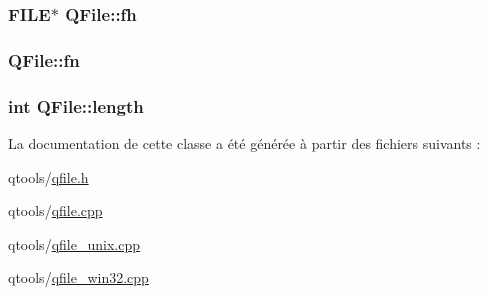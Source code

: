 \subsubsection[{fh}]{\setlength{\rightskip}{0pt plus 5cm}F\+I\+L\+E$\ast$ Q\+File\+::fh\hspace{0.3cm}{\ttfamily [protected]}}\label{class_q_file_a1ff87fa1a08ce3d4d8ae87252f4be11a}
\hypertarget{class_q_file_ae088d4677b272210ec510c55454930a4}{}
\subsubsection[{fn}]{ Q\+File\+::fn\hspace{0.3cm}{\ttfamily [protected]}}\label{class_q_file_ae088d4677b272210ec510c55454930a4}
\hypertarget{class_q_file_add1ff97139b091dcca4f3958c3dbd484}{}
\subsubsection[{length}]{\setlength{\rightskip}{0pt plus 5cm}int Q\+File\+::length\hspace{0.3cm}{\ttfamily [protected]}}\label{class_q_file_add1ff97139b091dcca4f3958c3dbd484}


La documentation de cette classe a été générée à partir des fichiers suivants \+:\begin{DoxyCompactItemize}
\item 
qtools/\hyperlink{qfile_8h}{qfile.\+h}\item 
qtools/\hyperlink{qfile_8cpp}{qfile.\+cpp}\item 
qtools/\hyperlink{qfile__unix_8cpp}{qfile\+\_\+unix.\+cpp}\item 
qtools/\hyperlink{qfile__win32_8cpp}{qfile\+\_\+win32.\+cpp}\end{DoxyCompactItemize}
